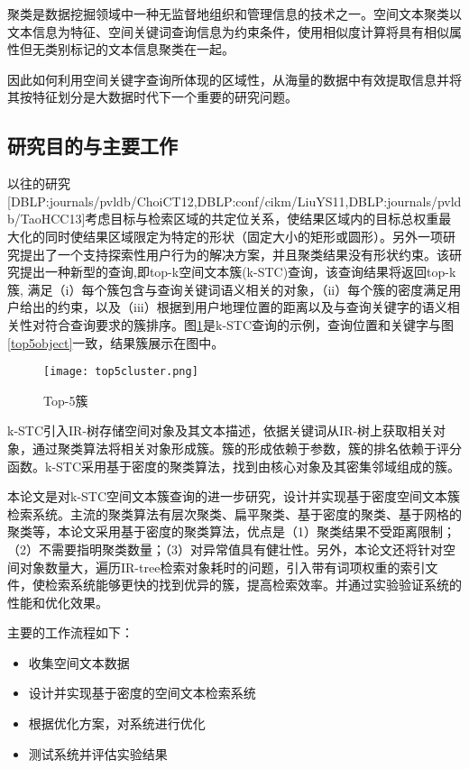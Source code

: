 聚类是数据挖掘领域中一种无监督地组织和管理信息的技术之一。空间文本聚类以文本信息为特征、空间关键词查询信息为约束条件，使用相似度计算将具有相似属性但无类别标记的文本信息聚类在一起。

因此如何利用空间关键字查询所体现的区域性，从海量的数据中有效提取信息并将其按特征划分是大数据时代下一个重要的研究问题。

\subsection{研究目的与主要工作}
以往的研究[DBLP:journals/pvldb/ChoiCT12,DBLP:conf/cikm/LiuYS11,DBLP:journals/pvldb/TaoHCC13]考虑目标与检索区域的共定位关系，使结果区域内的目标总权重最大化的同时使结果区域限定为特定的形状（固定大小的矩形或圆形）。另外一项研究\cite{DBLP:conf/cikm/WuJ16}提出了一个支持探索性用户行为的解决方案，并且聚类结果没有形状约束。该研究提出一种新型的查询,即top-k空间文本簇(k-STC)查询，该查询结果将返回top-k簇, 满足（i）每个簇包含与查询关键词语义相关的对象，（ii）每个簇的密度满足用户给出的约束，以及（iii）根据到用户地理位置的距离以及与查询关键字的语义相关性对符合查询要求的簇排序。图\ref{top5cluster}是k-STC查询的示例，查询位置和关键字与图\ref{top5object}一致，结果簇展示在图中。
\begin{figure}[htbp]
	\begin{center}
		\texttt{[image: top5cluster.png]}
		\caption{Top-5簇}
		\label{top5cluster}
	\end{center}
\end{figure}

k-STC引入IR-树存储空间对象及其文本描述，依据关键词从IR-树上获取相关对象，通过聚类算法将相关对象形成簇。簇的形成依赖于参数，簇的排名依赖于评分函数。k-STC采用基于密度的聚类算法，找到由核心对象及其密集邻域组成的簇。

本论文是对k-STC空间文本簇查询的进一步研究，设计并实现基于密度空间文本簇检索系统。主流的聚类算法有层次聚类、扁平聚类、基于密度的聚类、基于网格的聚类等，本论文采用基于密度的聚类算法，优点是（1）聚类结果不受距离限制；（2）不需要指明聚类数量；（3）对异常值具有健壮性。另外，本论文还将针对空间对象数量大，遍历IR-tree检索对象耗时的问题，引入带有词项权重的索引文件，使检索系统能够更快的找到优异的簇，提高检索效率。并通过实验验证系统的性能和优化效果。

主要的工作流程如下：
\begin{itemize}
	\item 收集空间文本数据
	\item 设计并实现基于密度的空间文本检索系统
	\item 根据优化方案，对系统进行优化
	\item 测试系统并评估实验结果
\end{itemize}

